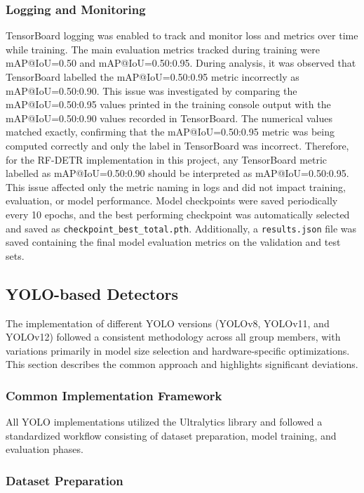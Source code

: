\documentclass{article}
\begin{document}
\subsubsection*{Logging and Monitoring} TensorBoard logging was enabled to track and monitor loss and metrics over time while training. The main evaluation metrics tracked during training were mAP@IoU=0.50 and mAP@IoU=0.50:0.95. During analysis, it was observed that TensorBoard labelled the mAP@IoU=0.50:0.95 metric incorrectly as mAP@IoU=0.50:0.90. This issue was investigated by comparing the mAP@IoU=0.50:0.95 values printed in the training console output with the mAP@IoU=0.50:0.90 values recorded in TensorBoard. The numerical values matched exactly, confirming that the mAP@IoU=0.50:0.95 metric was being computed correctly and only the label in TensorBoard was incorrect. Therefore, for the RF-DETR implementation in this project, any TensorBoard metric labelled as mAP@IoU=0.50:0.90 should be interpreted as mAP@IoU=0.50:0.95. This issue affected only the metric naming in logs and did not impact training, evaluation, or model performance. Model checkpoints were saved periodically every 10 epochs, and the best performing checkpoint was automatically selected and saved as \verb|checkpoint_best_total.pth|. Additionally, a \verb|results.json| file was saved containing the final model evaluation metrics on the validation and test sets.

\subsection{YOLO-based Detectors}

The implementation of different YOLO versions (YOLOv8, YOLOv11, and YOLOv12) followed a consistent methodology across all group members, with variations primarily in model size selection and hardware-specific optimizations. This section describes the common approach and highlights significant deviations.

\subsubsection*{Common Implementation Framework}

All YOLO implementations utilized the Ultralytics library and followed a standardized workflow consisting of dataset preparation, model training, and evaluation phases.

\subsubsection*{Dataset Preparation}
\end{document}
